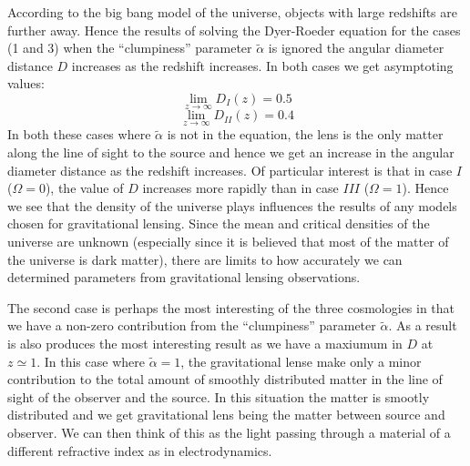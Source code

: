 \documentclass[aspectratio=1610,xcolor=dvipsnames,t]{beamer}
\begin{document}
According to the big bang model of the universe, objects with large
redshifts are further away. Hence the results of solving the Dyer-Roeder
equation for the cases (1 and 3) when the ``clumpiness'' parameter 
$\tilde{\alpha}$ is ignored the angular diameter distance $D$ increases
as the redshift increases. In both cases we get asymptoting values:
\begin{equation}
    \lim_{z \rightarrow \infty} D_{I}(z) = 0.5
\end{equation}
\begin{equation}
    \lim_{z \rightarrow \infty} D_{II}(z) = 0.4
\end{equation}
In both these cases where $\tilde{\alpha}$ is not in the equation, 
the lens is the only matter along the line of sight to the source and
hence we get an increase in the angular diameter distance as the redshift 
increases. Of particular interest is that in case $I$ ($\Omega = 0$), 
the value of $D$ increases more rapidly than in case $III$ ($\Omega = 1$).
Hence we see that the density of the universe plays influences the results
of any models chosen for gravitational lensing. Since the mean and 
critical densities of the universe are unknown (especially since it is
believed that most of the matter of the universe is dark matter), 
there are limits to how accurately we can determined parameters from
gravitational lensing observations.

The second case is perhaps the most interesting of the three cosmologies
in that we have a non-zero contribution from the ``clumpiness'' parameter
$\tilde{\alpha}$. As a result is also produces the most interesting result
as we have a maxiumum in $D$ at $z \simeq 1$. 
In this case where $\tilde{\alpha} = 1$, the gravitational lense
make only a minor contribution to the total amount of smoothly distributed
matter in the line of sight of the observer and the source. In this situation
the matter is smootly distributed and we get gravitational lens being
the matter between source and observer. We can then think of this
as the light passing through a material of a different refractive index
as in electrodynamics.
\end{document}
